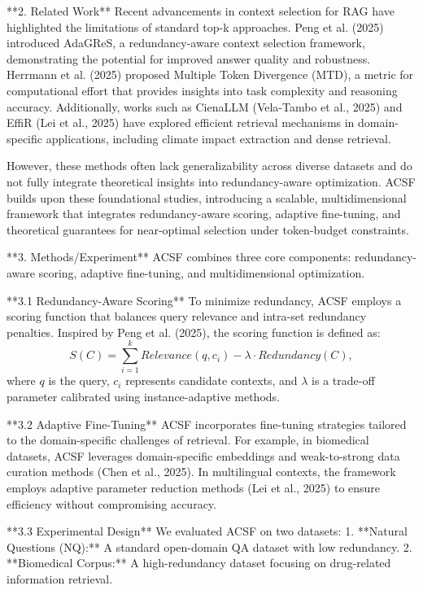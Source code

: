 **2. Related Work**  
Recent advancements in context selection for RAG have highlighted the limitations of standard top-k approaches. Peng et al. (2025) introduced AdaGReS, a redundancy-aware context selection framework, demonstrating the potential for improved answer quality and robustness. Herrmann et al. (2025) proposed Multiple Token Divergence (MTD), a metric for computational effort that provides insights into task complexity and reasoning accuracy. Additionally, works such as CienaLLM (Vela-Tambo et al., 2025) and EffiR (Lei et al., 2025) have explored efficient retrieval mechanisms in domain-specific applications, including climate impact extraction and dense retrieval.  

However, these methods often lack generalizability across diverse datasets and do not fully integrate theoretical insights into redundancy-aware optimization. ACSF builds upon these foundational studies, introducing a scalable, multidimensional framework that integrates redundancy-aware scoring, adaptive fine-tuning, and theoretical guarantees for near-optimal selection under token-budget constraints.  

**3. Methods/Experiment**  
ACSF combines three core components: redundancy-aware scoring, adaptive fine-tuning, and multidimensional optimization.  

**3.1 Redundancy-Aware Scoring**  
To minimize redundancy, ACSF employs a scoring function that balances query relevance and intra-set redundancy penalties. Inspired by Peng et al. (2025), the scoring function is defined as:  
\[ S(C) = \sum_{i=1}^{k} Relevance(q, c_i) - \lambda \cdot Redundancy(C), \]  
where \( q \) is the query, \( c_i \) represents candidate contexts, and \( \lambda \) is a trade-off parameter calibrated using instance-adaptive methods.  

**3.2 Adaptive Fine-Tuning**  
ACSF incorporates fine-tuning strategies tailored to the domain-specific challenges of retrieval. For example, in biomedical datasets, ACSF leverages domain-specific embeddings and weak-to-strong data curation methods (Chen et al., 2025). In multilingual contexts, the framework employs adaptive parameter reduction methods (Lei et al., 2025) to ensure efficiency without compromising accuracy.  

**3.3 Experimental Design**  
We evaluated ACSF on two datasets:  
1. **Natural Questions (NQ):** A standard open-domain QA dataset with low redundancy.  
2. **Biomedical Corpus:** A high-redundancy dataset focusing on drug-related information retrieval.  


